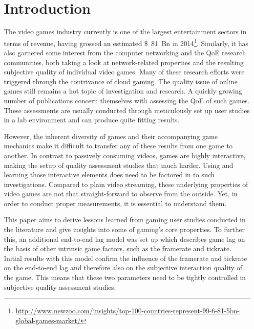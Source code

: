 \section{Introduction}
\label{sec:introduction}

The video games industry currently is one of the largest entertainment sectors in terms of revenue, having grossed an estimated \SI{81}[\$]{Bn} in 2014\footnote{\url{http://www.newzoo.com/insights/top-100-countries-represent-99-6-81-5bn-global-games-market/}}. Similarly, it has also garnered some interest from the computer networking and the \gls{QoE} research communities, both taking a look at network-related properties and the resulting subjective quality of individual video games. Many of these research efforts were triggered through the contrivance of cloud gaming. The quality issue of online games still remains a hot topic of investigation and research. A quickly growing number of publications concern themselves with assessing the \gls{QoE} of such games. These assessments are usually conducted through meticulously set up user studies in a lab environment and can produce quite fitting results.

However, the inherent diversity of games and their accompanying game mechanics make it difficult to transfer any of these results from one game to another. In contrast to passively consuming videos, games are highly interactive, making the setup of quality assessment studies that much harder. Using and learning those interactive elements does need to be factored in to such investigations. Compared to plain video streaming, these underlying properties of video games are not that straight-forward to observe from the outside. Yet, in order to conduct proper measurements, it is essential to understand them.

This paper aims to derive lessons learned from gaming user studies conducted in the literature and give insights into some of gaming's core properties. To further this, an additional end-to-end lag model was set up which describes game lag on the basis of other intrinsic game factors, such as the framerate and tickrate. Initial results with this model confirm the influence of the framerate and tickrate on the end-to-end lag and therefore also on the subjective interaction quality of the game. This means that these two parameters need to be tightly controlled in subjective quality assessment studies.
